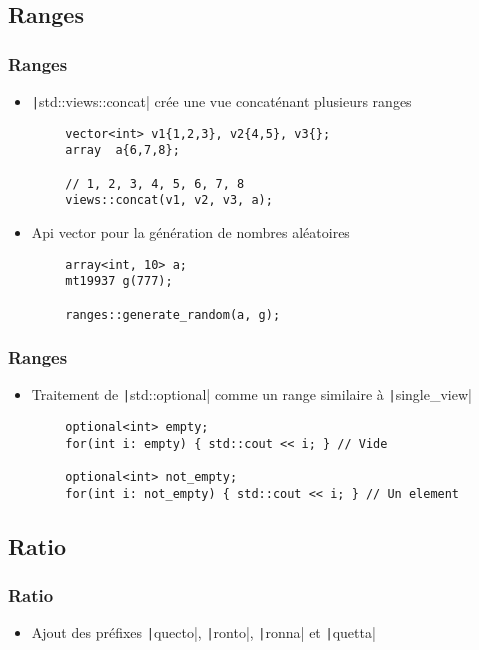 \documentclass[C++.tex]{subfiles}
\begin{document}
\subsection*{Ranges}
\begin{frame}[fragile]
	\frametitle{Ranges}
	\begin{itemize}
		\item \texttt|std::views::concat| crée une vue concaténant plusieurs ranges
	\end{itemize}

	\begin{verbatim}
		vector<int> v1{1,2,3}, v2{4,5}, v3{};
		array  a{6,7,8};

		// 1, 2, 3, 4, 5, 6, 7, 8
		views::concat(v1, v2, v3, a);
	\end{verbatim}

	\begin{itemize}
		\item Api \og{}vector\fg{} pour la génération de nombres aléatoires
	\end{itemize}

	\begin{verbatim}
		array<int, 10> a;
		mt19937 g(777);

		ranges::generate_random(a, g);
	\end{verbatim}

\end{frame}

\begin{frame}[fragile]
	\frametitle{Ranges}
	\begin{itemize}
		\item Traitement de \texttt|std::optional| comme un range similaire à \texttt|single_view|
	\end{itemize}

	\begin{verbatim}
		optional<int> empty;
		for(int i: empty) { std::cout << i; } // Vide

		optional<int> not_empty;
		for(int i: not_empty) { std::cout << i; } // Un element
	\end{verbatim}

\end{frame}

\subsection*{Ratio}
\begin{frame}[fragile]
	\frametitle{Ratio}
	\begin{itemize}
		\item Ajout des préfixes \texttt|quecto|, \texttt|ronto|, \texttt|ronna| et \texttt|quetta|
	\end{itemize}

\end{frame}
\end{document}
